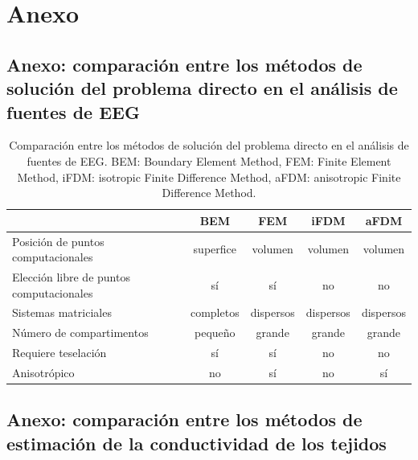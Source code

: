 %
\chapter{Anexo}
\label{sec:appendix}

\section{Anexo: comparación	entre los métodos de solución del problema directo en el análisis de fuentes de EEG}
\label{sec:appendix:forward_problem_comparison}


\begin{table}[htb]
	\centering
	\begin{tabular}{@{}lcccc@{}}
	\toprule
											 & BEM       & FEM       & iFDM      & aFDM      \\ \midrule
	Posición de puntos computacionales       & superfice & volumen   & volumen   & volumen   \\
	Elección libre de puntos computacionales & sí        & sí        & no        & no        \\
	Sistemas matriciales                     & completos & dispersos & dispersos & dispersos \\
	Número de compartimentos                 & pequeño   & grande    & grande    & grande    \\
	Requiere teselación                      & sí        & sí        & no        & no        \\
	Anisotrópico                             & no        & sí        & no        & sí        \\ \bottomrule
	\end{tabular}
	\caption{Comparación entre los métodos de solución del problema directo en el análisis de fuentes de EEG. BEM: Boundary Element Method, FEM: Finite Element Method, iFDM: isotropic Finite Difference Method, aFDM: anisotropic Finite Difference Method.}
	\label{tab:forward_problem_comparison}
	\end{table}

\newpage
\section{Anexo: comparación entre los métodos de estimación de la conductividad de los tejidos}
\label{sec:appendix:conductivity_comparison}



